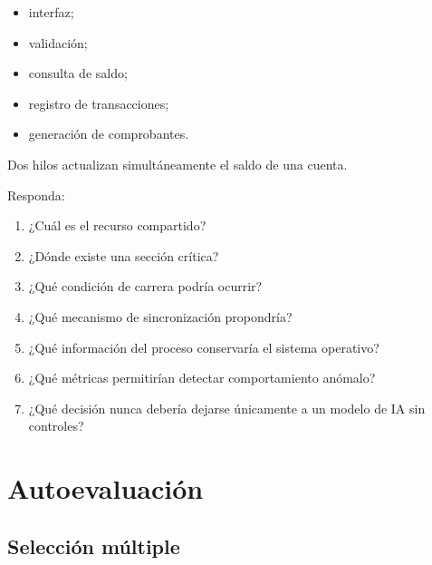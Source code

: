 \documentclass[
  spanish,
  letterpaper,
]{scrbook}
\providecommand{\tightlist}{%
  \setlength{\itemsep}{0pt}\setlength{\parskip}{0pt}}
\begin{document}
\begin{itemize}
\tightlist
\item
  interfaz;
\item
  validación;
\item
  consulta de saldo;
\item
  registro de transacciones;
\item
  generación de comprobantes.
\end{itemize}

Dos hilos actualizan simultáneamente el saldo de una cuenta.

Responda:

\begin{enumerate}
\def\labelenumi{\arabic{enumi}.}
\tightlist
\item
  ¿Cuál es el recurso compartido?
\item
  ¿Dónde existe una sección crítica?
\item
  ¿Qué condición de carrera podría ocurrir?
\item
  ¿Qué mecanismo de sincronización propondría?
\item
  ¿Qué información del proceso conservaría el sistema operativo?
\item
  ¿Qué métricas permitirían detectar comportamiento anómalo?
\item
  ¿Qué decisión nunca debería dejarse únicamente a un modelo de IA sin
  controles?
\end{enumerate}


\chapter{Autoevaluación}\label{autoevaluaciuxf3n-2}

\section{Selección múltiple}\label{selecciuxf3n-muxfaltiple}
\end{document}
